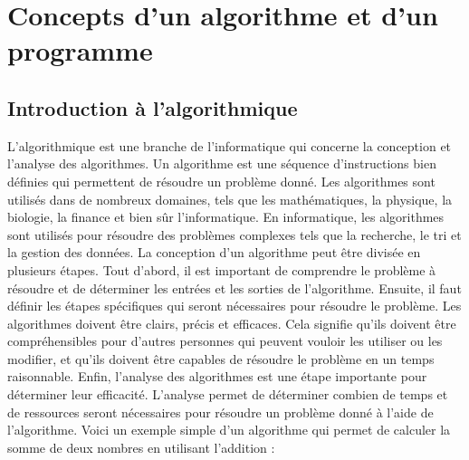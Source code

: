 \documentclass{uofa-eng-assignment}
\begin{document}
\maketitle

\section{Concepts d'un algorithme et d'un programme}

\subsection{Introduction à l'algorithmique}
L'algorithmique est une branche de l'informatique qui concerne la conception et l'analyse des algorithmes. Un algorithme est une séquence d'instructions bien définies qui permettent de résoudre un problème donné.
\newline \newline
Les algorithmes sont utilisés dans de nombreux domaines, tels que les mathématiques, la physique, la biologie, la finance et bien sûr l'informatique. En informatique, les algorithmes sont utilisés pour résoudre des problèmes complexes tels que la recherche, le tri et la gestion des données.
\newline \newline
La conception d'un algorithme peut être divisée en plusieurs étapes. Tout d'abord, il est important de comprendre le problème à résoudre et de déterminer les entrées et les sorties de l'algorithme. Ensuite, il faut définir les étapes spécifiques qui seront nécessaires pour résoudre le problème.
\newline \newline
Les algorithmes doivent être clairs, précis et efficaces. Cela signifie qu'ils doivent être compréhensibles pour d'autres personnes qui peuvent vouloir les utiliser ou les modifier, et qu'ils doivent être capables de résoudre le problème en un temps raisonnable.
\newline \newline
Enfin, l'analyse des algorithmes est une étape importante pour déterminer leur efficacité. L'analyse permet de déterminer combien de temps et de ressources seront nécessaires pour résoudre un problème donné à l'aide de l'algorithme.
\newline \newline
Voici un exemple simple d'un algorithme qui permet de calculer la somme de deux nombres en utilisant l'addition :
\end{document}
